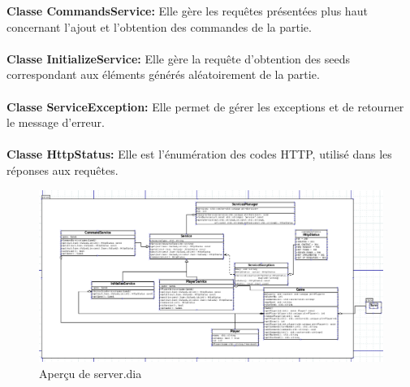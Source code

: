 \textbf{Classe CommandsService:} Elle gère les requêtes 
présentées plus haut concernant 
l'ajout et l'obtention des 
commandes de la partie. 
\\\\
\textbf{Classe InitializeService:} 
Elle gère la requête d'obtention 
des seeds correspondant aux 
éléments générés aléatoirement de 
la partie. 
\\\\
\textbf{Classe ServiceException:} Elle permet de gérer 
les exceptions et de retourner le message d'erreur.
\\\\
\textbf{Classe HttpStatus:} Elle est l'énumération des codes HTTP, utilisé dans les réponses aux requêtes. 

\begin{figure}[H]
\includegraphics[width=\linewidth]{images/server_dia.png}
\centering
\caption{Aperçu de server.dia}
\label{fig:img6}
\end{figure}
\newpage